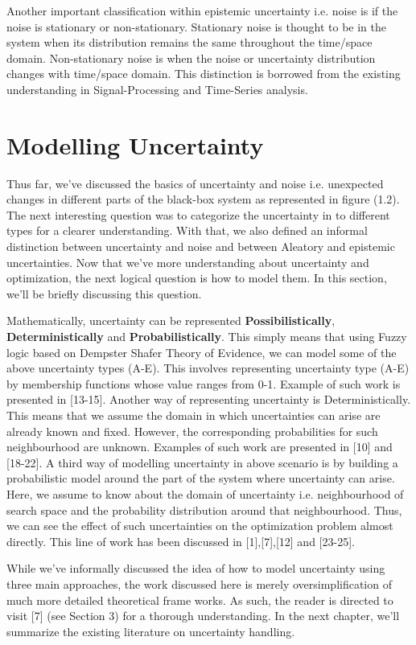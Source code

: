 Another important classification within epistemic uncertainty i.e. noise is if the noise is stationary or non-stationary. Stationary noise is thought to be in the system when its distribution remains the same throughout the time/space domain. Non-stationary noise is when the noise or uncertainty distribution changes with time/space domain. This distinction is borrowed from the existing understanding in Signal-Processing and Time-Series analysis. 

\section {Modelling Uncertainty}

Thus far, we've discussed the basics of uncertainty and noise i.e. unexpected changes in different parts of the black-box system as represented in figure (1.2). The next interesting question was to categorize the uncertainty in to different types for a clearer understanding. With that, we also defined an informal distinction between uncertainty and noise and between Aleatory and epistemic uncertainties. Now that we've more understanding about uncertainty and optimization, the next logical question is how to model them. In this section, we'll be briefly discussing this question.

Mathematically, uncertainty can be represented  \textbf{Possibilistically}, \textbf{Deterministically} and \textbf{Probabilistically}. This simply means that using Fuzzy logic based on Dempster Shafer Theory of Evidence, we can model some of the above uncertainty types (A-E). This involves representing uncertainty type (A-E) by membership functions whose value ranges from 0-1. Example of such work is presented in [13-15]. Another way of representing uncertainty is Deterministically. This means that we assume the domain in which uncertainties can arise are already known and fixed. However, the corresponding probabilities for such neighbourhood are unknown. Examples of such work are presented in [10] and [18-22]. A third way of modelling uncertainty in above scenario is by building a probabilistic model around the part of the system where uncertainty can arise. Here, we assume to know about the domain of uncertainty i.e. neighbourhood of search space and the probability distribution around that neighbourhood. Thus, we can see the effect of such uncertainties on the optimization problem almost directly. This line of work has been discussed in [1],[7],[12] and [23-25].

While we've informally discussed the idea of how to model uncertainty using three main approaches, the work discussed here is merely oversimplification of much more detailed theoretical frame works. As such, the reader is directed to visit [7] (see Section 3) for a thorough understanding. In the next chapter, we'll summarize the existing literature on uncertainty handling. 






